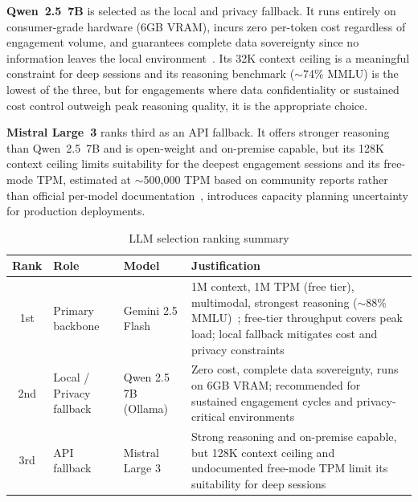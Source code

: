 \documentclass[12pt,a4paper]{report}
\begin{document}
\textbf{Qwen~2.5~7B} is selected as the local and privacy fallback. It runs
entirely on consumer-grade hardware (6GB VRAM), incurs zero per-token cost
regardless of engagement volume, and guarantees complete data sovereignty since
no information leaves the local environment~\cite{qwen25report}. Its 32K context
ceiling is a meaningful constraint for deep sessions and its reasoning benchmark
($\sim$74\% MMLU) is the lowest of the three, but for engagements where data
confidentiality or sustained cost control outweigh peak reasoning quality, it
is the appropriate choice.

\textbf{Mistral Large~3} ranks third as an API fallback. It offers stronger
reasoning than Qwen~2.5~7B and is open-weight and on-premise capable, but its
128K context ceiling limits suitability for the deepest engagement sessions and
its free-mode TPM, estimated at $\sim$500{,}000 TPM based on community reports
rather than official per-model documentation~\cite{mistralDocs}, introduces
capacity planning uncertainty for production deployments.

\begin{table}[H]
    \centering
    \renewcommand{\arraystretch}{1.35}
    \begin{tabular}{|c|p{}|p{}|p{}|}
        \hline
        \textbf{Rank} & \textbf{Role} & \textbf{Model} &
        \textbf{Justification} \\
        \hline
        1st & Primary backbone &
        Gemini 2.5 Flash &
        1M context, 1M TPM (free tier), multimodal, strongest
        reasoning ($\sim$88\% MMLU)~\cite{llmstatsFlash}; free-tier
        throughput covers peak load; local fallback mitigates cost
        and privacy constraints \\
        \hline
        2nd & Local / Privacy fallback &
        Qwen 2.5 7B (Ollama) &
        Zero cost, complete data sovereignty, runs on 6GB VRAM;
        recommended for sustained engagement cycles and
        privacy-critical environments~\cite{qwen25report} \\
        \hline
        3rd & API fallback &
        Mistral Large 3 &
        Strong reasoning and on-premise capable, but 128K context
        ceiling and undocumented free-mode TPM limit its suitability
        for deep sessions~\cite{mistralDocs} \\
        \hline
    \end{tabular}
    \caption{LLM selection ranking summary}
    \label{tab:llm_decision}
\end{table}
\end{document}
